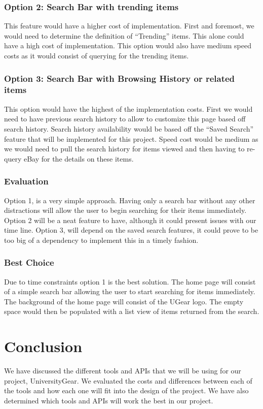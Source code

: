 \documentclass[journal,compsoc, 10pt, draftclsnofoot, onecolumn]{IEEEtran}
\begin{document}
\subsubsection*{Option 2: Search Bar with trending items}
This feature would have a higher cost of implementation. First and foremost, we 
would need to determine the definition of ``Trending'' items. This alone could 
have a high cost of implementation. This option would also have medium speed 
costs as it would consist of querying for the trending items.
\subsubsection*{Option 3: Search Bar with Browsing History or related items}
This option would have the highest of the implementation costs. First we would 
need to have previous search history to allow to customize this page based off 
search history. Search history availability would be based off the ``Saved 
Search'' feature that will be implemented for this project. Speed cost would 
be medium as we would need to pull the search history for items viewed and then 
having to re-query eBay for the details on these items. 
\subsubsection{Evaluation}
Option 1, is a very simple approach. Having only a search bar without any other 
distractions will allow the user to begin searching for their items immediately. 
Option 2 will be a neat feature to have, although it could present issues with 
our time line. Option 3, will depend on the saved search features, it could prove 
to be too big of a dependency to implement this in a timely fashion.
\subsubsection{Best Choice}
Due to time constraints option 1 is the best solution. The home page will 
consist of a simple search bar allowing the user to start searching for items 
immediately. The background of the home page will consist of the UGear logo. 
The empty space would then be populated with a list view of items returned from the search.

\section{Conclusion}
We have discussed the different tools and APIs that we will be using for our
project, UniversityGear. We evaluated the costs and differences between each 
of the tools and how each one will fit into the design of the project. We have also 
determined which tools and APIs will work the best in our project.
\end{document}
